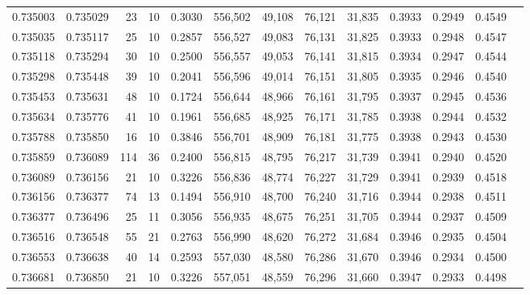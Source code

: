 \begin{tabular}{rrrrrrrrrrrrr}
0.735003 & 0.735029 &    23 &  10 &                                     0.3030 & 556,502 &  49,108 &  76,121 &  31,835 & 0.3933 & 0.2949 & 0.4549 \\
0.735035 & 0.735117 &    25 &  10 &                                     0.2857 & 556,527 &  49,083 &  76,131 &  31,825 & 0.3933 & 0.2948 & 0.4547 \\
0.735118 & 0.735294 &    30 &  10 &                                     0.2500 & 556,557 &  49,053 &  76,141 &  31,815 & 0.3934 & 0.2947 & 0.4544 \\
0.735298 & 0.735448 &    39 &  10 &                                     0.2041 & 556,596 &  49,014 &  76,151 &  31,805 & 0.3935 & 0.2946 & 0.4540 \\
0.735453 & 0.735631 &    48 &  10 &                                     0.1724 & 556,644 &  48,966 &  76,161 &  31,795 & 0.3937 & 0.2945 & 0.4536 \\
0.735634 & 0.735776 &    41 &  10 &                                     0.1961 & 556,685 &  48,925 &  76,171 &  31,785 & 0.3938 & 0.2944 & 0.4532 \\
0.735788 & 0.735850 &    16 &  10 &                                     0.3846 & 556,701 &  48,909 &  76,181 &  31,775 & 0.3938 & 0.2943 & 0.4530 \\
0.735859 & 0.736089 &   114 &  36 &                                     0.2400 & 556,815 &  48,795 &  76,217 &  31,739 & 0.3941 & 0.2940 & 0.4520 \\
0.736089 & 0.736156 &    21 &  10 &                                     0.3226 & 556,836 &  48,774 &  76,227 &  31,729 & 0.3941 & 0.2939 & 0.4518 \\
0.736156 & 0.736377 &    74 &  13 &                                     0.1494 & 556,910 &  48,700 &  76,240 &  31,716 & 0.3944 & 0.2938 & 0.4511 \\
0.736377 & 0.736496 &    25 &  11 &                                     0.3056 & 556,935 &  48,675 &  76,251 &  31,705 & 0.3944 & 0.2937 & 0.4509 \\
0.736516 & 0.736548 &    55 &  21 &                                     0.2763 & 556,990 &  48,620 &  76,272 &  31,684 & 0.3946 & 0.2935 & 0.4504 \\
0.736553 & 0.736638 &    40 &  14 &                                     0.2593 & 557,030 &  48,580 &  76,286 &  31,670 & 0.3946 & 0.2934 & 0.4500 \\
0.736681 & 0.736850 &    21 &  10 &                                     0.3226 & 557,051 &  48,559 &  76,296 &  31,660 & 0.3947 & 0.2933 & 0.4498 \\

\end{tabular}
